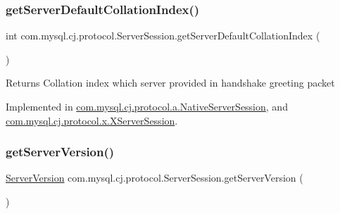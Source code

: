 \mbox{\label{interfacecom_1_1mysql_1_1cj_1_1protocol_1_1_server_session_a840bf74b75252459afd6b33ae21c8379}} 
\subsubsection{\texorpdfstring{get\+Server\+Default\+Collation\+Index()}{getServerDefaultCollationIndex()}}
{\footnotesize\ttfamily int com.\+mysql.\+cj.\+protocol.\+Server\+Session.\+get\+Server\+Default\+Collation\+Index (\begin{DoxyParamCaption}{ }\end{DoxyParamCaption})}

\begin{DoxyReturn}{Returns}
Collation index which server provided in handshake greeting packet 
\end{DoxyReturn}


Implemented in \mbox{\hyperlink{classcom_1_1mysql_1_1cj_1_1protocol_1_1a_1_1_native_server_session_aeaccfa02aeae2a872f2d92412a051de0}{com.\+mysql.\+cj.\+protocol.\+a.\+Native\+Server\+Session}}, and \mbox{\hyperlink{classcom_1_1mysql_1_1cj_1_1protocol_1_1x_1_1_x_server_session_abbcbd0f1d4c0c4fab564b3ce8083ecf7}{com.\+mysql.\+cj.\+protocol.\+x.\+X\+Server\+Session}}.

\mbox{\label{interfacecom_1_1mysql_1_1cj_1_1protocol_1_1_server_session_a96ad6ba424e7065b39d9b83dae49834a}} 
\subsubsection{\texorpdfstring{get\+Server\+Version()}{getServerVersion()}}
{\footnotesize\ttfamily \mbox{\hyperlink{classcom_1_1mysql_1_1cj_1_1_server_version}{Server\+Version}} com.\+mysql.\+cj.\+protocol.\+Server\+Session.\+get\+Server\+Version (\begin{DoxyParamCaption}{ }\end{DoxyParamCaption})}

